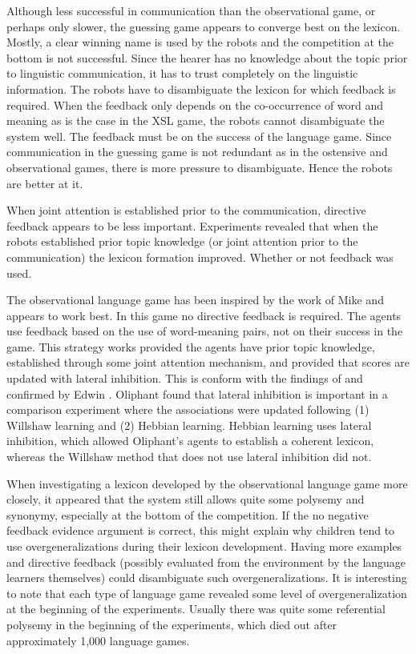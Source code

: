 Although less successful in communication than the observational game, or perhaps only slower, the guessing game appears to converge best on the lexicon. Mostly, a clear winning name is used by the robots and the competition at the bottom is not successful. Since the hearer has no knowledge about the topic prior to linguistic communication, it has to trust completely on the linguistic information. The robots have to disambiguate the lexicon for which feedback is required. When the feedback only depends on the co-occurrence of word and meaning as is the case in the XSL game, the robots cannot disambiguate the system well. The feedback must be on the success of the language game. Since communication in the guessing game is not redundant as in the ostensive and observational games, there is more pressure to disambiguate. Hence the robots are better at it.



When joint attention is established prior to the communication, directive feedback appears to be less important. Experiments revealed that when the robots established prior topic knowledge (or joint attention prior to the communication) the lexicon formation improved. Whether or not feedback was used. 

The observational language game has been inspired by the work of Mike \citet{oliphant:1997} and appears to work best. In this game no directive feedback is required.  The agents use feedback based on the use of word-meaning pairs, not on their success in the game. This strategy works provided the agents have prior topic knowledge, established through some joint attention mechanism, and provided that scores are updated with lateral inhibition. This is conform with the findings of \citet{oliphant:1997,oliphant:1998} and confirmed by Edwin \citet{dejong:2000}. Oliphant found that lateral inhibition is important in a comparison experiment where the associations were updated following (1) Willshaw learning and (2) Hebbian learning. Hebbian learning uses lateral inhibition, which allowed Oliphant's agents to establish a coherent lexicon, whereas the Willshaw method  that does not use lateral inhibition did not.

When investigating a lexicon developed by the observational language game more closely, it appeared that the system still allows quite some polysemy and synonymy, especially at the bottom of the competition. If the no negative feedback evidence argument is correct, this might explain why children tend to use overgeneralizations during their lexicon development. Having more examples and directive feedback (possibly evaluated from the environment by the language learners themselves) could disambiguate such overgeneralizations. It is interesting to note that each type of language game revealed some level of overgeneralization at the beginning of the experiments. Usually there was quite some referential polysemy in the beginning of the experiments, which died out after approximately 1,000 language games. 

